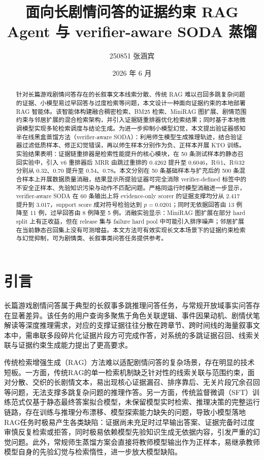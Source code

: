 \documentclass[UTF8,a4paper,12pt]{ctexart}
\title{面向长剧情问答的证据约束 RAG Agent 与 verifier-aware SODA 蒸馏}
\author{250851 张涵宾}
\date{2026 年 6 月}
\begin{document}
\maketitle

\begin{abstract}
针对长篇游戏剧情问答存在的长叙事文本线索分散、传统 RAG 难以召回多跳复杂问题的证据、小模型易过早回答与过度检索等问题，本文设计一种面向证据约束的本地部署 RAG 智能体。该智能体构建融合稠密检索、BM25 检索、MiniRAG 图扩展、剧情范围约束与邻居扩展的混合检索架构，并引入证据链重排器优化检索结果；同时基于本地微调模型实现多轮检索调度与结论生成。为进一步抑制小模型幻觉，本文提出验证器感知半在线黑盒蒸馏方法（verifier-aware SODA）：利用师生模型生成推理轨迹，结合验证器过滤低质样本、修正幻觉错误，再以师生样本分别作为负、正样本开展 KTO 训练。实验结果表明：证据链重排器是检索性能提升的核心模块，在 50 条测试样本的静态召回实验中，引入 v6 重排器后 MRR 由跳过重排的 0.4262 提升至 0.6046，R@1、R@32 分别从 0.32、0.70 提升至 0.54、0.78。本文分别在 50 条基础样本与扩充后的 500 条混合样本上开展数据质量消融，结果显示所提验证器可完全消除 verifier-defined 标签中的不安全正样本、先验知识污染与动作不匹配问题。严格同运行时模型消融进一步显示，verifier-aware SODA 在 60 条输出上将 evidence-only scorer 的证据支撑均分从 2.417 提升到 3.017，support score 成对符号检验达到 $p=0.0201$；同时无依据回答由 13 例降至 11 例，过早回答由 8 例降至 5 例。消融实验显示：MiniRAG 图扩展在部分 hard split 上有正收益，但在 release 集与 failure hard pool 中可能引入排序噪声；邻居扩展在当前静态召回集上没有可测增益。本文方法可有效实现长文本场景下的证据约束检索与幻觉抑制，可为剧情类、长叙事类问答任务提供参考。
\end{abstract}

\section{引言}

长篇游戏剧情问答属于典型的长叙事多跳推理问答任务，与常规开放域事实问答存在显著差异。该任务的用户查询多聚焦于角色关联逻辑、事件因果动机、剧情伏笔解读等深度推理需求，对应的支撑证据往往分散在跨章节、跨时间线的海量叙事文本中，需串联多段碎片化证据片段方可完成作答，对系统的多跳证据召回、线索关联与证据约束生成能力提出了更高要求。

传统检索增强生成（RAG）方法难以适配剧情问答的复杂场景，存在明显的技术短板。一方面，传统RAG的单一检索机制缺乏针对性的线索关联与范围约束，面对分散、交织的长剧情文本，易出现核心证据漏召、排序靠后、无关片段冗余召回等问题，无法支撑多跳复杂问题的推理作答。另一方面，传统监督微调（SFT）训练范式仅基于静态最终答案拟合模型，未保留模型实时检索、推理决策的完整运行链路，存在训练与推理分布漂移、模型探索能力缺失的问题，导致小模型落地RAG任务时极易产生各类缺陷：证据尚未充足时过早输出答案、证据完备时过度审慎反复检索或拒答，同时极易依赖模型先验知识生成无依据内容，引发严重的幻觉问题。此外，常规师生蒸馏方案会直接将教师模型输出作为正样本，易继承教师模型自身的先验幻觉与检索惰性，进一步放大模型缺陷。
\end{document}

